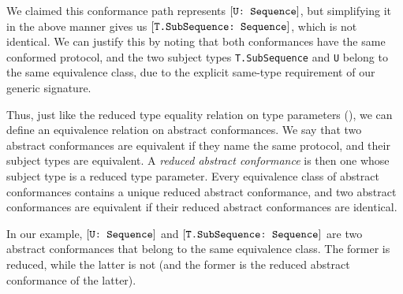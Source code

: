 \documentclass[../generics]{subfiles}
\begin{document}
We claimed this conformance path represents $[\texttt{U:~Sequence}]$, but simplifying it in the above manner gives us $[\texttt{T.SubSequence:~Sequence}]$, which is not identical. We can justify this by noting that both conformances have the same conformed protocol, and the two subject types \texttt{T.SubSequence} and \texttt{U} belong to the same equivalence class, due to the explicit same-type requirement of our generic signature.

Thus, just like the reduced type equality relation on type parameters (), we can define an equivalence relation on abstract conformances. We say that two abstract conformances are equivalent if they name the same protocol, and their subject types are equivalent. A \emph{reduced abstract conformance} is then one whose subject type is a reduced type parameter. Every equivalence class of abstract conformances contains a unique reduced abstract conformance, and two abstract conformances are equivalent if their reduced abstract conformances are identical.

In our example, $[\texttt{U:~Sequence}]$ and $[\texttt{T.SubSequence:~Sequence}]$ are two abstract conformances that belong to the same equivalence class. The former is reduced, while the latter is not (and the former is the reduced abstract conformance of the latter).
\end{document}
